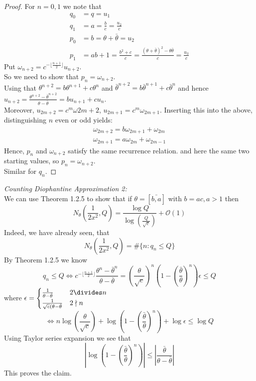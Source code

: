 \documentclass[NumTh.tex]{subfiles}
\begin{document}
\begin{proof}
  For $n = 0, 1$ we note that 
  \begin{align}
  q_0 &= q = u_1\\
  q_1 &= a = \frac{b}{c} = \frac{u_2}{c}\\
  p_0 &= b = \theta + \bar{\theta} = u_2\\
  p_1 &= a b + 1 = \frac{b^2+c}{c} = \frac{(\theta + \bar{\theta})^2 - \theta \bar{\theta}}{c} = \frac{u_3}{c}
 \end{align}
 Put $\omega_{n+2} = c^{-\lfloor\frac{n+1}{2} \rfloor} u_{n+2}$.\\
 So we need to show that $p_n = \omega_{n+2}$.\\
 Using that $\theta^{n+2} = b \theta^{n+1} + c \theta^n$ and $\bar{\theta}^{n+2} = b \bar{\theta}^{n+1} + c \bar{\theta}^n$
 and hence $u_{n+2} = \frac{\theta^{n+2} - \bar{\theta}^{n+2}}{\theta - \bar{\theta}} = b u_{n+1} + c u_n$.\\
 Moreover, $u_{2m+2} = c^m \omega{2m+2}$, $u_{2m+1} = c^m \omega_{2m+1}$.
 Inserting this into the above, distinguishing $n$ even or odd yields:
 \begin{align}
   \omega_{2m+2} = b \omega_{2m+1} + \omega_{2m}\\
   \omega_{2m+1} = a \omega_{2m} + \omega_{2m - 1}
 \end{align}
 Hence, $p_n$ and $\omega_{n+2}$ satisfy the same recurrence relation. and here the same two starting values, so $p_n = \omega_{n+2}$.\\
 Similar for $q_n$.
\end{proof}

\emph{Counting Diophantine Approximation 2:}\\
We can use Theorem 1.2.5 to show that if $\theta = [\bar{b,a}]$ with $b = a c, a>1$ then 
\[ N_\theta(\frac{1}{2x^2},Q) = \frac{\log Q}{\log(\frac{Q}{\sqrt{c}})} + \mathcal{O}(1)\]
Indeed, we have already seen, that 
\[ N_\theta(\frac{1}{2x^2},Q) = \#\{n: q_n \leq Q \} \]
By Theorem 1.2.5 we know
\[ q_n \leq Q \iff c^{-\lfloor\frac{n+1}{2} \rfloor} \frac{\theta^n - \bar{\theta}^n}{\theta - \bar{\theta}} = \left(\frac{\theta}{\sqrt{c}}\right)^n \left( 1 - \left(\frac{\bar{\theta}}{\theta}\right)^n\right) \epsilon \leq Q\]
where $ \epsilon = \begin{cases} \frac{1}{\theta - \bar{\theta}} & 2 \divides n\\ \frac{1}{\sqrt{c}(\theta -\bar{\theta}} & 2 \nmid n \end{cases}$
\[ \iff n \log\left(\frac{\theta}{\sqrt{c}}\right) + \log\left( 1 - \left(\frac{\bar{\theta}}{\theta}\right)^n\right) + \log \epsilon \leq \log Q \]
Using Taylor series expansion we see that 
\[ | \log\left( 1 - \left(\frac{\bar{\theta}}{\theta} \right)^n\right) | \leq | \frac{\bar{\theta}}{\theta - \bar{\theta}} |  \]
This proves the claim.
\end{document}
